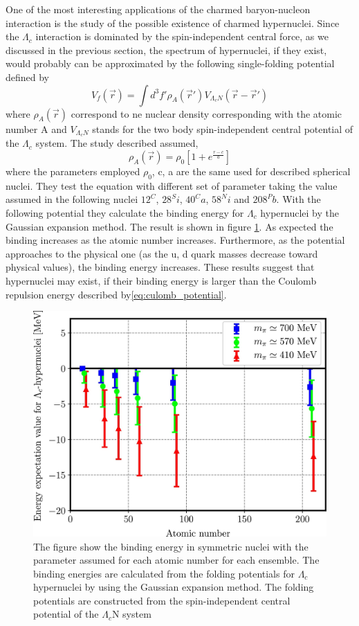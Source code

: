 \documentclass[12pt,a4paper]{book}
\begin{document}
	One of the most interesting applications of the charmed baryon-nucleon interaction is the study of the possible existence of charmed hypernuclei. Since the $\Lambda_c$ interaction is dominated by the spin-independent central force, as we discussed in the previous section, the spectrum of hypernuclei, if they exist, would probably can be approximated by the following single-folding potential defined by
	\begin{equation}
		V_f(\vec{r}) = \int d^3f' \rho_A (\vec{r}') V_{\Lambda_cN} (\vec{r}- \vec{r}') 
	\end{equation}
	where $\rho_A(\vec{r})$ correspond to ne nuclear density corresponding with the atomic number A and $V_{\Lambda_cN}$ stands for the two body spin-independent central potential of the $\Lambda_c$ system. The study described assumed,
	\begin{equation}
		\rho_A(\vec{r})=\rho_0 \left[1+ e^{\frac{r-c}{a}}\right]
	\end{equation}
	where the parameters employed $\rho_0$, c, a are the same used for described spherical nuclei. They test the equation with different set of parameter taking the value assumed in the following nuclei ${12}^C$, ${28}^Si$, ${40}^Ca$, ${58}^Ni$ and ${208}^Pb$.
	With the following potential they calculate the binding energy for $\Lambda_c$ hypernuclei by the Gaussian expansion method. The result is shown in figure \ref{fig:binding_energy}. As expected the binding increases as the atomic number increases. Furthermore, as the potential approaches to the physical one (as the u, d quark masses decrease toward physical values), the binding energy increases. These results suggest that hypernuclei may exist, if their binding energy is larger than the Coulomb repulsion energy described by\ref{eq:culomb_potential}.
	
	\begin{figure}
		\centering
		\includegraphics[width=0.74 \linewidth]{pictures/binding_energy.jpg}
		\caption{ The figure show the binding energy in symmetric nuclei with the parameter assumed for each atomic number for each ensemble. The binding energies are calculated from the folding potentials for $\Lambda_c$ hypernuclei by using the Gaussian expansion method. The folding potentials are constructed from the spin-independent central potential of the $\Lambda_c$N system}
		\label{fig:binding_energy}
	\end{figure}
	
\end{document}
